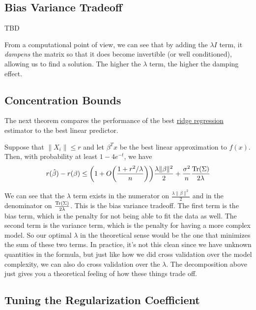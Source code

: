 \subsection{Bias Variance Tradeoff}

  \begin{theorem}
    \label{thm:bias-variance-decomposition-of-ridge-regression}
    TBD 
  \end{theorem}

  From a computational point of view, we can see that by adding the $\lambda I$ term, it \textit{dampens} the matrix so that it does become invertible (or well conditioned), allowing us to find a solution. The higher the $\lambda$ term, the higher the damping effect. 

\subsection{Concentration Bounds}

  The next theorem compares the performance of the best \hyperref[def:ridge-regression]{ridge regression} estimator to the best linear predictor. 

  \begin{theorem}
    \label{thm:hsu-kakade-zhang-2014-cite-hsu2014random}
 
    Suppose that $\|X_i\| \leq r$ and let $\beta^T x$ be the best linear approximation to $f(x)$. Then, with probability at least $1 - 4 e^{-t}$, we have
    \begin{equation}
      r(\hat{\beta}) - r(\beta) \leq \bigg( 1 + O \bigg( \frac{1 + r^2 / \lambda}{n} \bigg) \bigg) \frac{\lambda \|\beta\|^2}{2} + \frac{\sigma^2}{n} \frac{\operatorname{Tr}(\Sigma)}{2 \lambda}
    \end{equation}
  \end{theorem}

  We can see that the $\lambda$ term exists in the numerator on $\frac{\lambda \|\beta\|^2}{2}$ and in the denominator on $\frac{\operatorname{Tr}(\Sigma)}{2 \lambda}$. This is the bias variance tradeoff. The first term is the bias term, which is the penalty for not being able to fit the data as well. The second term is the variance term, which is the penalty for having a more complex model. So our optimal $\lambda$ in the theoretical sense would be the one that minimizes the sum of these two terms. In practice, it's not this clean since we have unknown quantities in the formula, but just like how we did cross validation over the model complexity, we can also do cross validation over the $\lambda$. The decomposition above just gives you a theoretical feeling of how these things trade off. 

\subsection{Tuning the Regularization Coefficient}
